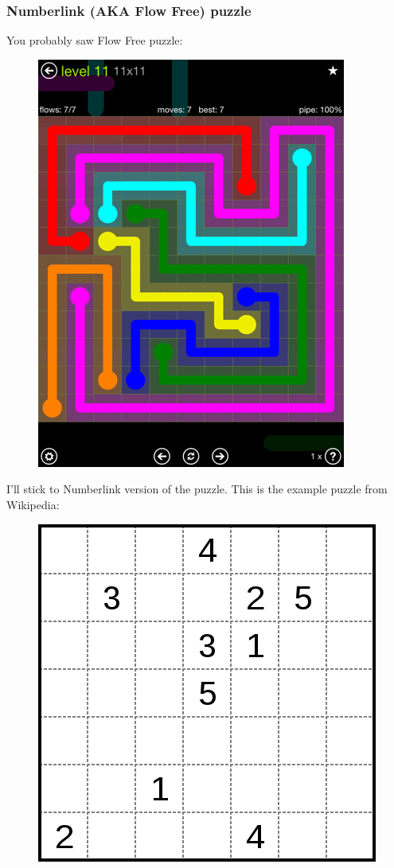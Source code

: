\subsubsection{Numberlink (\ac{AKA} Flow Free) puzzle}

You probably saw Flow Free puzzle:

\begin{figure}[H]
\centering
\includegraphics[scale=0.3]{puzzles/numberlink/Z3/flow-extreme-11-11.png}
\caption{}
\end{figure}

I'll stick to Numberlink version of the puzzle. This is the example puzzle from Wikipedia:

\begin{figure}[H]
\centering
\includegraphics[scale=0.3]{puzzles/numberlink/Z3/424px-Numberlink_puzzle.svg.png}
\caption{}
\end{figure}

